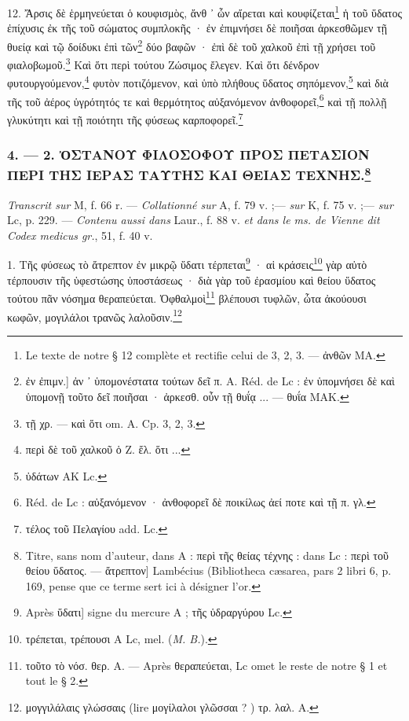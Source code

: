 \documentclass[a4paper, 11pt, oneside, polutonikogreek, french]{article}
\begin{document}
12. Ἄρσις δὲ ἑρμηνεύεται ὁ κουφισμὸς, ἄνθ ᾽ ὧν αἴρεται καὶ κουφίζεται\footnote{Le texte de notre § 12 complète et rectifie celui de 3, 2, 3. --- ἀνθῶν MA.} ἡ τοῦ ὕδατος ἐπίχυσις ἐκ τῆς τοῦ σώματος συμπλοκῆς · ἐν ἐπιμνήσει δὲ ποιῆσαι ἀρκεσθῶμεν τῇ θυείᾳ καὶ τῷ δοίδυκι ἐπὶ τῶν\footnote{ἐν ἐπιμν.] ἀν ᾽ ὑπομονέστατα τούτων δεῖ π. A. Réd. de Lc : ἐν ὑπομνήσει δὲ καὶ ὑπομονῇ τοῦτο δεῖ ποιῆσαι · ἀρκεσθ. οὖν τῇ θυΐᾳ ... --- θυΐα MAK.} δύο βαφῶν · ἐπὶ δὲ τοῦ χαλκοῦ ἐπὶ τῇ χρήσει τοῦ φιαλοβωμοῦ.\footnote{τῇ χρ. --- καὶ ὅτι om. A. Cp. 3, 2, 3.} Καὶ ὅτι περὶ τούτου Ζώσιμος ἔλεγεν. Καὶ ὅτι δένδρον φυτουργούμενον,\footnote{περὶ δὲ τοῦ χαλκοῦ ὁ Ζ. ἔλ. ὅτι ...} φυτὸν ποτιζόμενον, καὶ ὑπὸ πλήθους ὕδατος σηπόμενον,\footnote{ὐδάτων AK Lc.} καὶ διὰ τῆς τοῦ ἀέρος ὑγρότητός τε καὶ θερμότητος αὐξανόμενον ἀνθοφορεῖ,\footnote{Réd. de Lc : αὐξανόμενον · ἀνθοφορεῖ δὲ ποικίλως ἀεί ποτε καὶ τῇ π. γλ.} καὶ τῇ πολλῇ γλυκύτητι καὶ τῇ ποιότητι τῆς φύσεως καρποφορεῖ.\footnote{τέλος τοῦ Πελαγίου add. Lc.}

\bigskip
\centerline{\EightStarTaper}
\centerline{\EightStarTaper\EightStarTaper}
\bigskip

\subsubsection[4. --- 2. ὈΣΤΑΝΟΥ ΦΙΛΟΣΟΦΟΥ ΠΡΟΣ ΠΕΤΑΣΙΟΝ ΠΕΡΙ ΤΗΣ ΙΕΡΑΣ ΤΑΥΤΗΣ ΚΑΙ ΘΕΙΑΣ ΤΕΧΝΗΣ.]{4. --- 2. ὈΣΤΑΝΟΥ ΦΙΛΟΣΟΦΟΥ ΠΡΟΣ ΠΕΤΑΣΙΟΝ ΠΕΡΙ ΤΗΣ ΙΕΡΑΣ ΤΑΥΤΗΣ ΚΑΙ ΘΕΙΑΣ ΤΕΧΝΗΣ.\footnote{Titre, sans nom d'auteur, dans A : περὶ τῆς θείας τέχνης : dans Lc : περὶ τοῦ θείου ὕδατος. --- ἄτρεπτον] Lambécius (Bibliotheca cæsarea, pars 2 libri 6, p. 169, pense que ce terme sert ici à désigner l'or.}}

\emph{Transcrit sur} M, f. 66 r. --- \emph{Collationné sur} A, f. 79 v. ;--- \emph{sur} K, f. 75 v. ;--- \emph{sur} Lc, p. 229. --- \emph{Contenu aussi dans} Laur., f. 88 v. \emph{et dans le ms. de Vienne dit Codex medicus gr.}, 51, f. 40 v.

1. Τῆς φύσεως τὸ ἄτρεπτον ἐν μικρῷ ὕδατι τέρπεται\footnote{Après ὕδατι] signe du mercure A ; τῆς ὑδραργύρου Lc.} · αἱ κράσεις\footnote{τρέπεται, τρέπουσι A Lc, mel. (\emph{M. B.}).} γὰρ αὐτὸ τέρπουσιν τῆς ὑφεστώσης ὑποστάσεως · διὰ γὰρ τοῦ ἐρασμίου καὶ θείου ὕδατος τούτου πᾶν νόσημα θεραπεύεται. Ὀφθαλμοὶ\footnote{τοῦτο τὸ νόσ. θερ. A. --- Après θεραπεύεται, Lc omet le reste de notre § 1 et tout le § 2.} βλέπουσι τυφλῶν, ὦτα ἀκούουσι κωφῶν, μογιλάλοι τρανῶς λαλοῦσιν.\footnote{μογγιλάλαις γλώσσαις (lire μογίλαλοι γλῶσσαι ? ) τρ. λαλ. A.}
\end{document}
